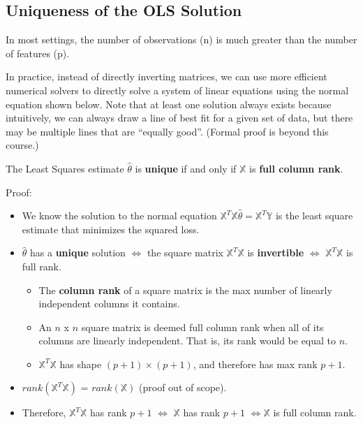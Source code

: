 \documentclass[
  letterpaper,
  DIV=11,
  numbers=noendperiod]{scrreprt}
\providecommand{\tightlist}{%
  \setlength{\itemsep}{0pt}\setlength{\parskip}{0pt}}\usepackage{longtable,booktabs,array}
\begin{document}
\subsection{Uniqueness of the OLS
Solution}\label{uniqueness-of-the-ols-solution}

In most settings, the number of observations (n) is much greater than
the number of features (p).

In practice, instead of directly inverting matrices, we can use more
efficient numerical solvers to directly solve a system of linear
equations using the normal equation shown below. Note that at least one
solution always exists because intuitively, we can always draw a line of
best fit for a given set of data, but there may be multiple lines that
are ``equally good''. (Formal proof is beyond this course.)

The Least Squares estimate \(\hat{\theta}\) is \textbf{unique} if and
only if \(\mathbb{X}\) is \textbf{full column rank}.

\begin{tcolorbox}[enhanced jigsaw, leftrule=.75mm, breakable, colframe=quarto-callout-color-frame, colback=white, left=2mm, rightrule=.15mm, arc=.35mm, bottomrule=.15mm, opacityback=0, toprule=.15mm]

Proof:

\begin{itemize}
\tightlist
\item
  We know the solution to the normal equation
  \(\mathbb{X}^T\mathbb{X}\hat{\theta} = \mathbb{X}^T\mathbb{Y}\) is the
  least square estimate that minimizes the squared loss.
\item
  \(\hat{\theta}\) has a \textbf{unique} solution \(\iff\) the square
  matrix \(\mathbb{X}^T\mathbb{X}\) is \textbf{invertible} \(\iff\)
  \(\mathbb{X}^T\mathbb{X}\) is full rank.

  \begin{itemize}
  \tightlist
  \item
    The \textbf{column rank} of a square matrix is the max number of
    linearly independent columns it contains.
  \item
    An \(n\) x \(n\) square matrix is deemed full column rank when all
    of its columns are linearly independent. That is, its rank would be
    equal to \(n\).
  \item
    \(\mathbb{X}^T\mathbb{X}\) has shape \((p + 1) \times (p + 1)\), and
    therefore has max rank \(p + 1\).
  \end{itemize}
\item
  \(rank(\mathbb{X}^T\mathbb{X})\) = \(rank(\mathbb{X})\) (proof out of
  scope).
\item
  Therefore, \(\mathbb{X}^T\mathbb{X}\) has rank \(p + 1\) \(\iff\)
  \(\mathbb{X}\) has rank \(p + 1\) \(\iff \mathbb{X}\) is full column
  rank.
\end{itemize}

\end{tcolorbox}
\end{document}
